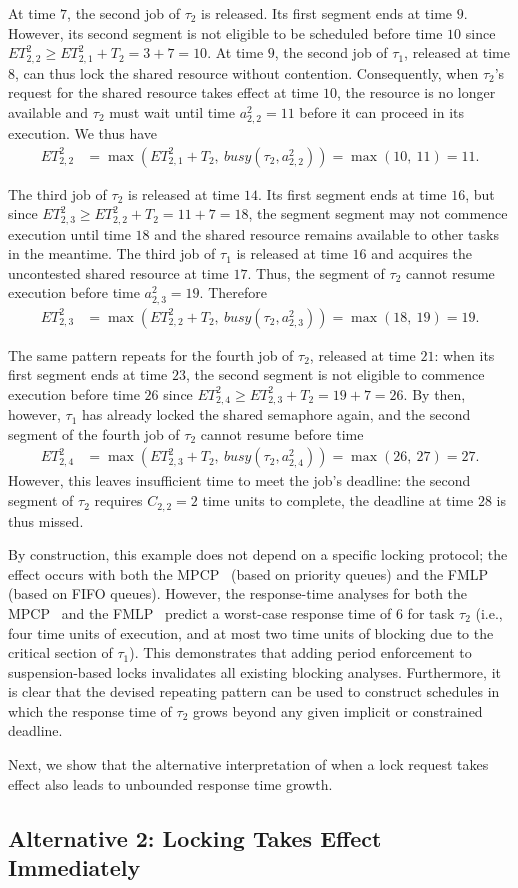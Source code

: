 At time $7$, the second job of $\tau_2$ is released. Its first segment ends at time $9$. However, its second segment is not eligible to be scheduled before time $10$ since $ET_{2,2}^2 \geq ET_{2,1}^2 + T_2 = 3 + 7 = 10$. At time $9$, the second job of $\tau_1$, released at time $8$, can thus lock the shared resource without contention. Consequently, when $\tau_2$'s request for the shared resource takes effect at time $10$, the resource is no longer available and $\tau_2$ must wait until time $a^2_{2,2} = 11$ before it can proceed in its execution. We thus have
\begin{align*}
	ET_{2,2}^2 & = \max\left(ET_{2,1}^2 + T_2,\ \mathit{busy}(\tau_2, a^2_{2,2})\right) =\max(10,\ 11) = 11.
\end{align*}

The third job of $\tau_2$ is released at time $14$. Its first segment ends at time $16$, but since $ET_{2,3}^2 \geq ET_{2,2}^2 + T_2 = 11 + 7 = 18$, the segment segment may not commence execution until time $18$ and the shared resource remains available to other tasks in the meantime. The third job of $\tau_1$ is released at time $16$ and acquires the uncontested shared resource at time $17$. Thus, the segment of $\tau_2$ cannot resume execution before time $a^2_{2,3} = 19$. Therefore
\begin{align*}
	ET_{2,3}^2 & = \max\left(ET_{2,2}^2 + T_2,\ \mathit{busy}(\tau_2, a^2_{2,3})\right) =\max(18,\ 19) = 19.
\end{align*}

The same pattern repeats for the fourth job of $\tau_2$, released at time $21$: when its first segment ends at time $23$, the second segment is not eligible to commence execution before time $26$ since $ET_{2,4}^2 \geq ET_{2,3}^2 + T_2 = 19 + 7 = 26$. By then, however, $\tau_1$ has already locked the shared semaphore again, and the second segment of the fourth job of $\tau_2$ cannot resume before time
\begin{align*}
	ET_{2,4}^2 & = \max\left(ET_{2,3}^2 + T_2,\ \mathit{busy}(\tau_2, a^2_{2,4})\right) =\max(26,\ 27) = 27.
\end{align*}
However, this leaves insufficient time to meet the job's deadline: the second segment of $\tau_2$ requires $C_{2,2} = 2$ time units to complete, the deadline at time $28$ is thus missed.

By construction, this example does not depend on a specific locking protocol; the effect occurs with both the MPCP~\cite{Ra:90} (based on priority queues) and the FMLP~\cite{BLBA:07,BA:08} (based on FIFO queues). However,  the response-time analyses for both the MPCP~\cite{LNR:09,Br:13} and the   FMLP~\cite{Br:13} predict a worst-case response time of $6$ for task $\tau_2$ (i.e., four time units of execution, and at most two time units of blocking due to the critical section of $\tau_1$). This demonstrates that adding period enforcement to suspension-based locks invalidates all existing blocking analyses. Furthermore, it is clear that the devised repeating pattern can be used to construct schedules in which the response time of $\tau_2$  grows beyond any given implicit or constrained deadline.

Next, we show that the alternative interpretation of when a lock request takes effect also leads to unbounded response time growth.


\subsection{Alternative 2: Locking Takes Effect Immediately}
